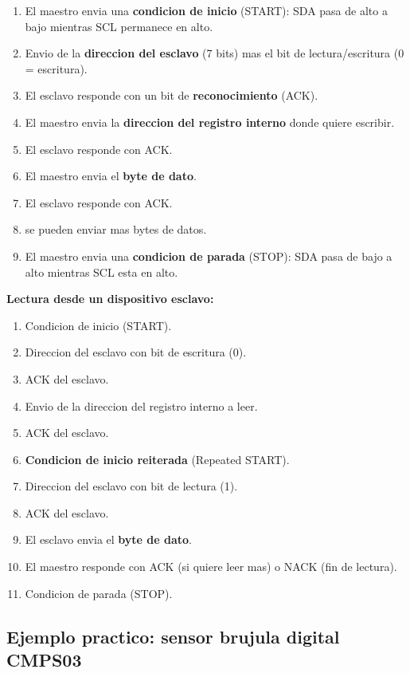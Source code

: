 \begin{enumerate}
    \item El maestro envia una \textbf{condicion de inicio} (START): SDA pasa de
    alto a bajo mientras SCL permanece en alto.
    \item Envio de la \textbf{direccion del esclavo} (7 bits) mas el bit de
    lectura/escritura (0 = escritura).
    \item El esclavo responde con un bit de \textbf{reconocimiento} (ACK).
    \item El maestro envia la \textbf{direccion del registro interno} donde quiere
    escribir.
    \item El esclavo responde con ACK.
    \item El maestro envia el \textbf{byte de dato}.
    \item El esclavo responde con ACK.
    \item [Opcionalmente] se pueden enviar mas bytes de datos.
    \item El maestro envia una \textbf{condicion de parada} (STOP): SDA pasa de
    bajo a alto mientras SCL esta en alto.
\end{enumerate}

\textbf{Lectura desde un dispositivo esclavo:}

\begin{enumerate}
    \item Condicion de inicio (START).
    \item Direccion del esclavo con bit de escritura (0).
    \item ACK del esclavo.
    \item Envio de la direccion del registro interno a leer.
    \item ACK del esclavo.
    \item \textbf{Condicion de inicio reiterada} (Repeated START).
    \item Direccion del esclavo con bit de lectura (1).
    \item ACK del esclavo.
    \item El esclavo envia el \textbf{byte de dato}.
    \item El maestro responde con ACK (si quiere leer mas) o NACK (fin de lectura).
    \item Condicion de parada (STOP).
\end{enumerate}

\subsection{Ejemplo practico: sensor brujula digital CMPS03}

